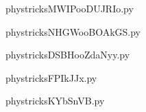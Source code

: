     

    \clearpage
    


    \newcommand{\CaptionFigMWIPooDUJRIo}{<+Type your caption here+>}
    \begin{center}
        
    \end{center}
    phystricksMWIPooDUJRIo.py

    

    \clearpage
    


    \newcommand{\CaptionFigNHGWooBOAkGS}{<+Type your caption here+>}
    \begin{center}
        
    \end{center}
    phystricksNHGWooBOAkGS.py

    

    \clearpage
    


    \newcommand{\CaptionFigDSBHooZdaNyy}{<+Type your caption here+>}
    \begin{center}
        
    \end{center}
    phystricksDSBHooZdaNyy.py

    

    \clearpage
    


    \newcommand{\CaptionFigFPIkJJx}{<+Type your caption here+>}
    \begin{center}
        
    \end{center}
    phystricksFPIkJJx.py

    

    \clearpage
    


    \newcommand{\CaptionFigKYbSnVB}{<+Type your caption here+>}
    \begin{center}
        
    \end{center}
    phystricksKYbSnVB.py

    

    \clearpage
    


